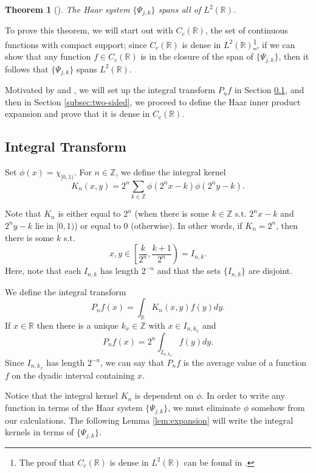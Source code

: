 \documentclass[11pt]{amsart}
\theoremstyle{theorem} %
\newtheorem{thm}{Theorem}[section] %
\theoremstyle{definition}
\theoremstyle{example}
\theoremstyle{remark}
\numberwithin{equation}{section}
\newcommand{\R}{\mathbb{R}}
\newcommand{\Z}{\mathbb{Z}}
\begin{document}
\begin{thm}[{\cite[411]{davidson}}] \label{thm:span}
	The Haar system $ \{ \varPsi_{j,k} \} $ spans all of $ L^2(\R) $.
\end{thm}

To prove this theorem, we will start out with $ C_c(\R) $, the set of continuous functions with compact support; since $ C_c(\R) $ is dense in $ L^2(\R) $\footnote{The proof that $ C_c(\R) $ is dense in $ L^2(\R) $ can be found in \cite[326]{farrell}.}, if we can show that any function $ f \in C_c(\R) $ is in the closure of the span of $ \{\varPsi_{j,k}\} $, then it follows that $ \{ \varPsi_{j,k} \} $ spans $ L^2(\R) $.

Motivated by \cite[3]{bell} and \cite[516]{davidson}, we will set up the integral transform $ P_nf $ in Section \ref{subsec:integral transform}, and then in Section \ref{subsec:two-sided}, we proceed to define the Haar inner product expansion and prove that it is dense in $ C_c(\R) $. 

\subsection{Integral Transform} \label{subsec:integral transform}
Set $ \phi(x) = \chi_{[0,1)}$. For $ n \in \Z $, we define the integral kernel
\[ K_n (x,y) = 2^n \sum_{k \in \Z} \phi(2^n x - k) \phi(2^n y - k). \]

Note that $ K_n $ is either equal to $ 2^n $ (when there is some $ k \in \Z $ s.t. $ 2^n x-k $ and $ 2^ny - k $ lie in $ [0,1) $) or equal to 0 (otherwise). In other words, if $ K_n = 2^n $, then there is some $ k $ s.t.
\begin{equation} \label{eq:K}
	x,y \in \left[ \frac{k}{2^n}, \frac{k+1}{2^n} \right) = I_{n,k}.
\end{equation}
Here, note that each $ I_{n,k} $ has length $ 2^{-n} $ and that
the sets $ \{ I_{n,k} \} $ are disjoint.

We define the integral transform
\[ P_n f(x) = \int_{\R} K_n(x,y) f(y) dy. \]
If $ x \in \R $ then there is a unique $ k_x \in \Z $ with $ x \in I_{n, k_x} $ and
\begin{equation} \label{eq:pnf}
	P_n f(x) = 2^n \int_{I_{n,k_x}} f(y) dy.
\end{equation}
Since $ I_{n,k_x} $ has length $ 2^{-n} $, we can say that $ P_nf $ is the average value of a function $ f $ on the dyadic interval containing $ x $.

\vspace{8pt}
Notice that the integral kernel $ K_n $ is dependent on $ \phi $. In order to write any function in terms of the Haar system $ \{ \varPsi_{j,k} \} $, we must eliminate $ \phi $ somehow from our calculations. The following Lemma \ref{lem:expansion} will write the integral kernels in terms of $ \{ \varPsi_{j,k} \} $.
\end{document}
